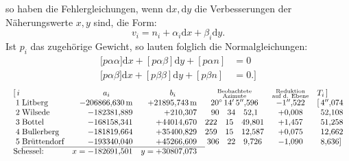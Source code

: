 \noindent so haben die Fehlergleichungen, wenn \(\mathrm{d}x,\mathrm{d}y\) die Verbesserungen der Näherungswerte \(x,y\) sind, die Form:
\[
 v_i=n_i+\alpha_i\mathrm{d}x+\beta_i\mathrm{d}y.
\]
Ist \(p_i\) das zugehörige Gewicht, so lauten folglich die Normalgleichungen:
\[
\begin{aligned}
 {[}p\alpha\alpha]\mathrm{d}x+[p\alpha\beta]\mathrm{d}y+[p\alpha n]&=0\\
 {[}p\alpha\beta]\mathrm{d}x+[p\beta\beta]\mathrm{d}y+[p\beta n]&=0.]
\end{aligned}
\]
\[
\resizebox{\linewidth}{!}{\(\begin{array}{@{}r@{\;}l@{\quad}r@{\quad}r@{\quad}c@{\quad}c@{\quad}l@{}}
 [\,i&&\multicolumn{1}{c}{a_i}&\multicolumn{1}{c}{b_i}&
 \substack{\text{Beobachtete}\\\text{Azimute}}&
 \substack{\text{Reduktion}\\\text{auf d. Ebene}}&T_i\,]\\
 1&\text{Litberg}&-206866{,}630\,\mathrm{m}&+21895{,}743\,\mathrm{m}
 &20^\circ\,14'\,5''{,}596&-1''{,}522&[\,4''{,}074\\
 2&\text{Wilsede}&-182381{,}889&+210{,}307&90\quad34\quad52{,}1&+0{,}008&\phantom{[\,}52{,}108\\
 3&\text{Bottel}&-168158{,}341&+44014{,}670&222\quad15\quad49{,}801&+1{,}457&\phantom{[\,}51{,}258\\
 4&\text{Bullerberg}&-181819{,}664&+35400{,}829&259\quad15\quad12{,}587&+0{,}075&\phantom{[\,}12{,}662\\
 5&\text{Brüttendorf}&-193340{,}040&+45266{,}609&306\quad22\quad9{,}726&-1{,}090&\phantom{[\,}8{,}636]\\
 \cline{2-4}
 \multicolumn{2}{@{}l}{\text{Schessel:}}&x=-182691{,}501&y=+30807{,}073&&&
\end{array}\)}
\]
